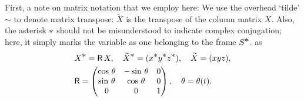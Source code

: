 \soln First, a note on matrix notation that we employ here: 
We use the overhead `tilde' $\sim$ to denote matrix  
transpose: $\tilde{X}$ is the transpose of the column 
matrix 
$X$. Also, the asterisk ${\textstyle \ast}$ should not be misunderstood 
to indicate complex conjugation; here, it simply marks the 
variable as one belonging to the frame $S^{\textstyle \ast}$. as
\begin{align}\label{af.42}
& X^{\textstyle \ast}=\mathsf{R}\,X,\quad
\widetilde{X}^{\textstyle \ast}=(x^{\textstyle \ast} y^{\textstyle \ast}
z^{\textstyle \ast}),\quad \widetilde{X}
=(x y z),\notag \\
& \mathsf{R}=\begin{pmatrix}\cos\,{\theta}&-\sin\,
{\theta}&0\\\sin\,{\theta}&\cos\,{\theta}
&0\\0&0&1\end{pmatrix} ,\quad
{\theta}={\theta}(t).
\end{align}

